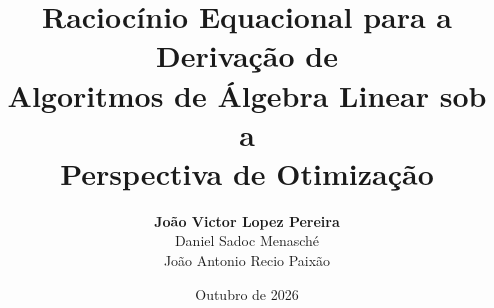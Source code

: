   \newcommand{\mul}{\cdot}
  \renewcommand{\deg}{\ensuremath{^\circ}}
  \renewcommand{\sin}[1]{\mathrm{sen}\left(#1\right)}
  \newcommand{\logtext}{\mathrm{log}}
  \renewcommand{\log}[1]{\logtext\left(#1\right)}
  \newcommand{\lntext}{\mathrm{ln}}
  \renewcommand{\ln}[1]{\lntext\left(#1\right)}
  \renewcommand{\exp}[1]{\mathrm{e}^{#1}}
  \newcommand{\abs}[1]{\left\lvert#1\right\rvert}

  \newcommand{\blackbox}{\raisebox{0.2ex}{\rule{1.2ex}{1.2ex}}}
  \newcommand{\whitebox}{\raisebox{0.2ex}{\fboxsep=0pt\fbox{\rule{1.2ex}{0pt}\rule{0pt}{1.2ex}}}}
  \newcommand{\fim}[2]{\vspace{0.075cm} \dfrac{#1}{#2}}

  \newcommand{\rep}[1]{\mathrm{rep}\left(#1\right)}
  \newcommand{\bigunion}{\bigcup}
  \newcommand{\bigintersec}{\bigcap}
  \newcommand{\E}{\Sigma}
  \newcommand{\st}{\,\,|\,\,}
  \newcommand{\bigst}{\,\,\,\,\rule[-0.5cm]{0.5pt}{6.8ex}\,\,\,\,}
  \newcommand{\impliesdown}{\displaystyle\Downarrow}

\title{Raciocínio Equacional para a Derivação de \\ Algoritmos de Álgebra Linear sob a \\ Perspectiva de Otimização}
\author{
  \textbf{João Victor Lopez Pereira} \\
  \vspace{0.2cm}
  Daniel Sadoc Menasché \\
  \vspace{0.2cm}
  João Antonio Recio Paixão
}
\date{Outubro de 2026}

